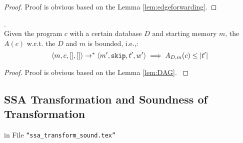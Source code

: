 %
{
\begin{proof}
Proof is obvious based on the Lemma \ref{lem:edgeforwarding}.
\end{proof}
}
%
\begin{lem}
.
\\
{
Given the program $c$ with a certain database $D$ and starting memory $m$, the $A(c)$ w.r.t. the $D$ and $m$ is bounded, i.e.,:
%
\[
\langle m, c, [], [] \rangle 
\rightarrow^{*} 
\langle m', \mathtt{skip}, t', w' \rangle 
\implies
A_{D, m}(c) \leq |t'|
\]
}
\end{lem}
%
\begin{proof}
{
Proof is obvious based on the Lemma \ref{lem:DAG}.
}
\end{proof}
%
%
\clearpage
%
%
\subsection{SSA Transformation and Soundness of Transformation}
in File {\tt ``ssa\_transform\_sound.tex''}
% 
%
\clearpage